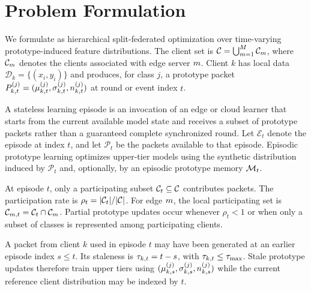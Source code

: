 \section{Problem Formulation}
\label{sec:formulation}

We formulate \ehsfp as hierarchical split-federated optimization over time-varying prototype-induced feature distributions. The client set is $\mathcal{C}=\bigcup_{m=1}^{M}\mathcal{C}_{m}$, where $\mathcal{C}_{m}$ denotes the clients associated with edge server $m$. Client $k$ has local data $\mathcal{D}_k=\{(x_i,y_i)\}$ and produces, for class $j$, a prototype packet $P_{k,t}^{(j)}=(\mu_{k,t}^{(j)},\sigma_{k,t}^{(j)},n_{k,t}^{(j)})$ at round or event index $t$.

\begin{definition}
A stateless learning episode is an invocation of an edge or cloud learner that starts from the current available model state and receives a subset of prototype packets rather than a guaranteed complete synchronized round. Let $\mathcal{E}_t$ denote the episode at index $t$, and let $\mathcal{P}_t$ be the packets available to that episode. Episodic prototype learning optimizes upper-tier models using the synthetic distribution induced by $\mathcal{P}_t$ and, optionally, by an episodic prototype memory $\mathcal{M}_t$.
\end{definition}

\begin{definition}
At episode $t$, only a participating subset $\mathcal{C}_t\subseteq\mathcal{C}$ contributes packets. The participation rate is $\rho_t=|\mathcal{C}_t|/|\mathcal{C}|$. For edge $m$, the local participating set is $\mathcal{C}_{m,t}=\mathcal{C}_t\cap\mathcal{C}_{m}$. Partial prototype updates occur whenever $\rho_t<1$ or when only a subset of classes is represented among participating clients.
\end{definition}

\begin{definition}
A packet from client $k$ used in episode $t$ may have been generated at an earlier episode index $s\leq t$. Its staleness is $\tau_{k,t}=t-s$, with $\tau_{k,t}\leq \tau_{\max}$. Stale prototype updates therefore train upper tiers using $(\mu_{k,s}^{(j)},\sigma_{k,s}^{(j)},n_{k,s}^{(j)})$ while the current reference client distribution may be indexed by $t$.
\end{definition}

